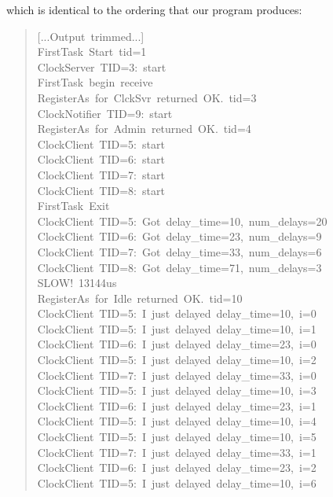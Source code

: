 \documentclass[letterpaper]{article}
\begin{document}
which is identical to the ordering that our program produces:
%
\begin{quote}{\ttfamily \raggedright \noindent
{[}...Output~trimmed...{]}\\
FirstTask~Start~tid=1\\
ClockServer~TID=3:~start\\
FirstTask~begin~receive\\
RegisterAs~for~ClckSvr~returned~OK.~tid=3\\
ClockNotifier~TID=9:~start\\
RegisterAs~for~Admin~returned~OK.~tid=4\\
ClockClient~TID=5:~start\\
ClockClient~TID=6:~start\\
ClockClient~TID=7:~start\\
ClockClient~TID=8:~start\\
FirstTask~Exit\\
ClockClient~TID=5:~Got~delay\_time=10,~num\_delays=20\\
ClockClient~TID=6:~Got~delay\_time=23,~num\_delays=9\\
ClockClient~TID=7:~Got~delay\_time=33,~num\_delays=6\\
ClockClient~TID=8:~Got~delay\_time=71,~num\_delays=3\\
SLOW!~13144us\\
RegisterAs~for~Idle~returned~OK.~tid=10\\
ClockClient~TID=5:~I~just~delayed~delay\_time=10,~i=0\\
ClockClient~TID=5:~I~just~delayed~delay\_time=10,~i=1\\
ClockClient~TID=6:~I~just~delayed~delay\_time=23,~i=0\\
ClockClient~TID=5:~I~just~delayed~delay\_time=10,~i=2\\
ClockClient~TID=7:~I~just~delayed~delay\_time=33,~i=0\\
ClockClient~TID=5:~I~just~delayed~delay\_time=10,~i=3\\
ClockClient~TID=6:~I~just~delayed~delay\_time=23,~i=1\\
ClockClient~TID=5:~I~just~delayed~delay\_time=10,~i=4\\
ClockClient~TID=5:~I~just~delayed~delay\_time=10,~i=5\\
ClockClient~TID=7:~I~just~delayed~delay\_time=33,~i=1\\
ClockClient~TID=6:~I~just~delayed~delay\_time=23,~i=2\\
ClockClient~TID=5:~I~just~delayed~delay\_time=10,~i=6\\
}
\end{quote}
\end{document}
